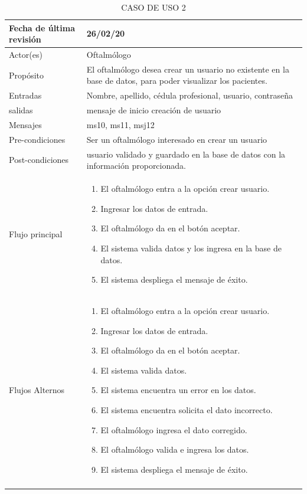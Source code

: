\documentclass[10pt]{article}
\begin{document}
\begin{longtable}{|p{3.8cm}|p{10.8cm}|}
\hline
Fecha de última revisión & 26/02/20\\
\hline
Actor(es) & Oftalmólogo \\
\hline
Propósito & El oftalmólogo desea crear un usuario no existente en la base de datos, para poder visualizar los pacientes.\\
\hline
Entradas & Nombre, apellido, cédula profesional, usuario, contraseña\\
\hline
salidas & mensaje de inicio creación de usuario\\
\hline
Mensajes & ms10, ms11, msj12\\
\hline
Pre-condiciones & Ser un oftalmólogo interesado en crear un usuario \\
\hline
Post-condiciones & usuario validado y guardado en la base de datos con la información proporcionada. \\
\hline
Flujo principal & \begin{enumerate}
    \item El oftalmólogo entra a la opción crear usuario.
    \item Ingresar los datos de entrada.
    \item El oftalmólogo da en el botón aceptar.
    \item El sistema valida datos y los ingresa en la base de datos.
    \item El sistema despliega el mensaje de éxito.
\end{enumerate}
    \\
\hline
Flujos Alternos &  \begin{enumerate}
    \item El oftalmólogo entra a la opción crear usuario.
    \item Ingresar los datos de entrada.
    \item El oftalmólogo da en el botón aceptar.
    \item El sistema valida datos.
    \item El sistema encuentra un error en los datos.
    \item El sistema encuentra solicita el dato incorrecto.
    \item El oftalmólogo ingresa el dato corregido.
    \item El oftalmólogo valida e ingresa los datos.
    \item El sistema despliega el mensaje de éxito.
\end{enumerate}\\
\hline
\caption{CASO DE USO 2}
\label{tabla1}
\end{longtable}
\end{document}
